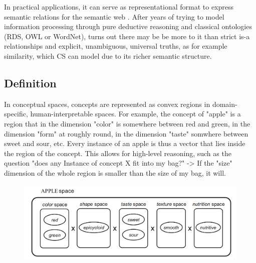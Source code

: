 In practical applications, it can serve as representational format to express semantic relations for the semantic web \cite{Gardenfors2004}. After years of trying to model information processing through pure deductive reasoning and classical ontologies (\eg RDS, OWL or WordNet), turns out there may be be more to it than strict is-a relationships and explicit, unambiguous, universal truths, as for example similarity, which CS can model due to its richer semantic structure. 

\subsection*{Definition}


In conceptual spaces, concepts are represented as convex regions in domain-specific, human-interpretable spaces. For example, the concept of "apple" is a region that in the dimension "color" is somewhere between red and green, in the dimension "form" at roughly round, in the dimension "taste" somwhere between sweet and sour, etc. Every instance of an apple is thus a vector that lies inside the region of the concept. This allows for high-level reasoning, such as the question "does any Instance of concept X fit into my bag?" -> If the "size" dimension of the whole region is smaller than the size of my bag, it will.

\begin{figure}[H]
	\centering
	\includegraphics[width=\textwidth]{graphics/stolenfigures/apple_space.png}
\end{figure}




